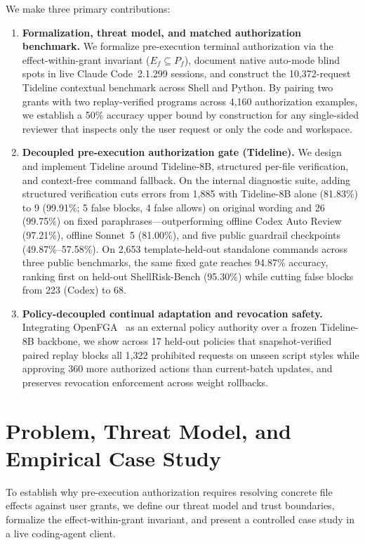 \documentclass[sigconf,anonymous,nonacm]{acmart}
\begin{document}
We make three primary contributions:
\begin{enumerate}
    \item \textbf{Formalization, threat model, and matched authorization benchmark.} We formalize pre-execution terminal authorization via the effect-within-grant invariant ($E_f \subseteq P_f$), document native auto-mode blind spots in live Claude Code~2.1.299 sessions, and construct the 10,372-request Tideline contextual benchmark across Shell and Python. By pairing two grants with two replay-verified programs across 4,160 authorization examples, we establish a 50\% accuracy upper bound by construction for any single-sided reviewer that inspects only the user request or only the code and workspace.
    \item \textbf{Decoupled pre-execution authorization gate (Tideline).} We design and implement Tideline around Tideline-8B, structured per-file verification, and context-free command fallback. On the internal diagnostic suite, adding structured verification cuts errors from 1,885 with Tideline-8B alone (81.83\%) to 9 (99.91\%; 5 false blocks, 4 false allows) on original wording and 26 (99.75\%) on fixed paraphrases---outperforming offline Codex Auto Review (97.21\%), offline Sonnet~5 (81.00\%), and five public guardrail checkpoints (49.87\%--57.58\%). On 2,653 template-held-out standalone commands across three public benchmarks, the same fixed gate reaches 94.87\% accuracy, ranking first on held-out ShellRisk-Bench (95.30\%) while cutting false blocks from 223 (Codex) to 68.
    \item \textbf{Policy-decoupled continual adaptation and revocation safety.} Integrating OpenFGA~\cite{openfgastores} as an external policy authority over a frozen Tideline-8B backbone, we show across 17 held-out policies that snapshot-verified paired replay blocks all 1,322 prohibited requests on unseen script styles while approving 360 more authorized actions than current-batch updates, and preserves revocation enforcement across weight rollbacks.
\end{enumerate}

\section{Problem, Threat Model, and Empirical Case Study}
\label{sec:problem}
To establish why pre-execution authorization requires resolving concrete file effects against user grants, we define our threat model and trust boundaries, formalize the effect-within-grant invariant, and present a controlled case study in a live coding-agent client.
\end{document}
